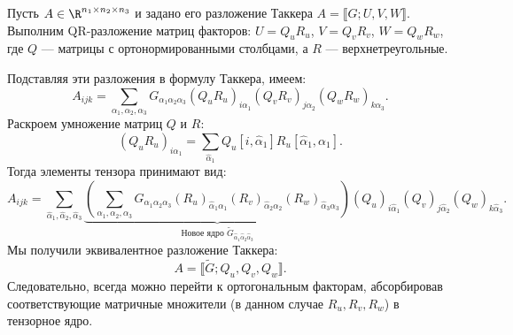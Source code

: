 \begin{tcbinsight}
    Пусть $A \in \R^{n_1 \times n_2 \times n_3}$ и задано его разложение Таккера $A = \llbracket G; U, V, W \rrbracket$.
    Выполним QR-разложение матриц факторов: 
    $U = Q_u R_u$, $V = Q_v R_v$, $W = Q_w R_w$, где $Q$ — матрицы с ортонормированными столбцами, а $R$ — верхнетреугольные.
    
    Подставляя эти разложения в формулу Таккера, имеем:
    \[
        A_{ijk} = \sum_{\alpha_1, \alpha_2, \alpha_3} G_{\alpha_1 \alpha_2 \alpha_3} (Q_u R_u)_{i \alpha_1} (Q_v R_v)_{j \alpha_2} (Q_w R_w)_{k \alpha_3}.
    \]
    Раскроем умножение матриц $Q$ и $R$:
    \[
        (Q_u R_u)_{i \alpha_1} = \sum_{\hat{\alpha}_1} Q_u[i, \hat{\alpha}_1] R_u[\hat{\alpha}_1, \alpha_1].
    \]
    Тогда элементы тензора принимают вид:
    \[
        A_{ijk} = \sum_{\hat{\alpha}_1, \hat{\alpha}_2, \hat{\alpha}_3} \underbrace{\left( \sum_{\alpha_1, \alpha_2, \alpha_3} G_{\alpha_1 \alpha_2 \alpha_3} (R_u)_{\hat{\alpha}_1 \alpha_1} (R_v)_{\hat{\alpha}_2 \alpha_2} (R_w)_{\hat{\alpha}_3 \alpha_3} \right)}_{\text{Новое ядро } \tilde{G}_{\hat{\alpha}_1 \hat{\alpha}_2 \hat{\alpha}_3}} (Q_u)_{i \hat{\alpha}_1} (Q_v)_{j \hat{\alpha}_2} (Q_w)_{k \hat{\alpha}_3}.
    \]
    Мы получили эквивалентное разложение Таккера:
    \[
        A = \llbracket \tilde{G}; Q_u, Q_v, Q_w \rrbracket.
    \]
    Следовательно, всегда можно перейти к ортогональным факторам, абсорбировав соответствующие матричные множители (в данном случае $R_u, R_v, R_w$) в тензорное ядро.
\end{tcbinsight}

